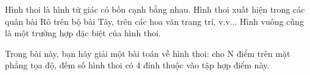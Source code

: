 Hình thoi là hình tứ giác có bốn cạnh bằng nhau. Hình thoi   xuất hiện trong các quân bài Rô trên bộ bài Tây, trên các hoa   văn trang trí, v.v... Hình vuông cũng là một trường hợp đặc biệt của hình thoi.  

   Trong bài này, bạn hãy giải một bài toán về hình thoi: cho   N điểm trên mặt phẳng tọa độ, đếm số hình thoi có 4 đỉnh   thuộc vào tập hợp điểm này.